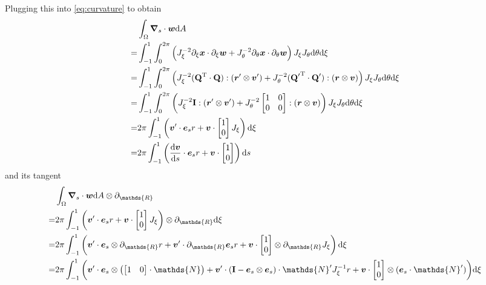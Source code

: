 \documentclass[a4paper,11pt]{article}
\renewcommand{\to}[1]{\text{\boldmath $#1$}} %
\newcommand{\ts}[1]{\text{\boldmath $\mathrm{#1}$}} %
\newcommand{\uv}[1]{\mathds{#1}}
\newcommand{\um}[1]{\mathds{#1}}
\newcommand{\intd}[1]{\mathrm{d}#1}
\newcommand{\pderiv}[2]{\partial_{#2} #1}
\newcommand{\dderiv}[2]{\frac{\mathrm{d}#1}{\mathrm{d}#2}}
\newcommand{\T}{\mathrm{T}}
\begin{document}
Plugging this into \eqref{eq:curvature} to obtain
\begin{align}
 &\int_\Omega\to \nabla_s\cdot\to w\intd A\\
=&\int_{-1}^{1}\int_0^{2\pi}\left( J_\xi^{-2} \pderiv{\to x}{\xi}\cdot\pderiv{\to w}{\xi} +
                              J_\theta^{-2} \pderiv{\to x}{\theta}\cdot\pderiv{\to w}{\theta}
  \right) J_\xi J_\theta \intd \theta \intd \xi\\
=&\int_{-1}^{1}\int_0^{2\pi}\left(
	  J_\xi^{-2} (\ts Q^\T\cdot\ts Q):(\to r'\otimes \to v') +
	  J_\theta^{-2} ({\ts Q'}^\T\cdot\ts Q'):(\to r\otimes\to v)
  \right) J_\xi J_\theta \intd \theta \intd \xi\\
=&\int_{-1}^{1}\int_0^{2\pi}\left(
	  J_\xi^{-2} \ts I :(\to r'\otimes \to v') +
	  J_\theta^{-2} \begin{bmatrix}1&0\\0&0\end{bmatrix}:(\to r \otimes \to v)
  \right) J_\xi J_\theta \intd \theta \intd \xi\\
=&2\pi\int_{-1}^{1}\left( \to v' \cdot \to e_s r + \to v \cdot \begin{bmatrix}1\\0\end{bmatrix} J_\xi \right) \intd \xi\\
=&2\pi\int_{-1}^{1}\left( \dderiv{\to v}{s} \cdot \to e_s r + \to v \cdot \begin{bmatrix}1\\0\end{bmatrix} \right) \intd s
\end{align}
and its tangent
\begin{align}
 &\int_\Omega\to \nabla_s\cdot\to w\intd A \otimes \pderiv{}{\uv R} \\
 =& 2\pi \int_{-1}^{1} \left(
	\to v' \cdot \to e_s r + \to v\cdot \begin{bmatrix}1\\0\end{bmatrix} J_\xi
	\right)\otimes\pderiv{}{\uv R}\intd\xi\\
  =& 2\pi \int_{-1}^{1} \left(
	\to v' \cdot \to e_s \otimes \pderiv{r}{\uv R} + \to v'\cdot \pderiv{\to e_s}{\uv R} r + \to v\cdot \begin{bmatrix}1\\0\end{bmatrix}\otimes\pderiv{J_\xi}{\uv R}
	\right)\intd\xi\\
  =& 2\pi \int_{-1}^{1} \bigg(
	\to v' \cdot \to e_s \otimes\left(\begin{bmatrix}1&0\end{bmatrix}\cdot \um N\right) +
	\to v'\cdot (\ts I - \to e_s\otimes \to e_s)\cdot \um N' J_\xi^{-1} r
	+\to v\cdot \begin{bmatrix}1\\0\end{bmatrix}\otimes (\to e_s\cdot \um N')
	\bigg)\intd\xi
\end{align}
\end{document}
